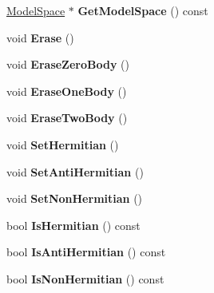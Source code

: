 \begin{DoxyCompactItemize}
\item 
\hypertarget{classOperator_a037a75a9f8a0dc970e56240552cc96d2}{\hyperlink{classModelSpace}{Model\-Space} $\ast$ {\bfseries Get\-Model\-Space} () const }\label{classOperator_a037a75a9f8a0dc970e56240552cc96d2}

\item 
\hypertarget{classOperator_a8a0f7d6aa5163929850d06b31dc24a55}{void {\bfseries Erase} ()}\label{classOperator_a8a0f7d6aa5163929850d06b31dc24a55}

\item 
\hypertarget{classOperator_aee08b8c721271c700f325e02ba7b47d1}{void {\bfseries Erase\-Zero\-Body} ()}\label{classOperator_aee08b8c721271c700f325e02ba7b47d1}

\item 
\hypertarget{classOperator_ab26470d0c88d61699443223675e57bbe}{void {\bfseries Erase\-One\-Body} ()}\label{classOperator_ab26470d0c88d61699443223675e57bbe}

\item 
\hypertarget{classOperator_a5c49da3f408b79a7430af4e3ec1ff8df}{void {\bfseries Erase\-Two\-Body} ()}\label{classOperator_a5c49da3f408b79a7430af4e3ec1ff8df}

\item 
\hypertarget{classOperator_aacf220459ab56d57e8c585a5293c5d4f}{void {\bfseries Set\-Hermitian} ()}\label{classOperator_aacf220459ab56d57e8c585a5293c5d4f}

\item 
\hypertarget{classOperator_a11bd88adeab50ade02c514a1e72ffffb}{void {\bfseries Set\-Anti\-Hermitian} ()}\label{classOperator_a11bd88adeab50ade02c514a1e72ffffb}

\item 
\hypertarget{classOperator_a80823b246f657f9a8e26d1462492e116}{void {\bfseries Set\-Non\-Hermitian} ()}\label{classOperator_a80823b246f657f9a8e26d1462492e116}

\item 
\hypertarget{classOperator_ae6a0b023e0196f2eab07864844683a89}{bool {\bfseries Is\-Hermitian} () const }\label{classOperator_ae6a0b023e0196f2eab07864844683a89}

\item 
\hypertarget{classOperator_a2801d2f6b547d0e2dad7bc3b16ceafe1}{bool {\bfseries Is\-Anti\-Hermitian} () const }\label{classOperator_a2801d2f6b547d0e2dad7bc3b16ceafe1}

\item 
\hypertarget{classOperator_ad6cbbe083bab3c90f5229cd046ed118f}{bool {\bfseries Is\-Non\-Hermitian} () const }\label{classOperator_ad6cbbe083bab3c90f5229cd046ed118f}


\end{DoxyCompactItemize}
